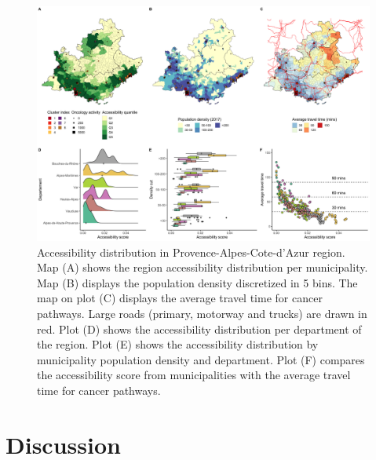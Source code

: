 \begin{figure}[h]
    \includegraphics[width=\textwidth]{images/camion/fig4_accessibility_Provence-Alpes-Cote-d'Azur.png}
    \centering
    \caption{
        Accessibility distribution in Provence-Alpes-Cote-d'Azur region. Map (A) shows the region accessibility distribution per municipality. Map (B) displays the population density discretized in 5 bins. The map on plot (C) displays the average travel time for cancer pathways. Large roads (primary, motorway and trucks) are drawn in red. Plot (D) shows the accessibility distribution per department of the region. Plot (E) shows the accessibility distribution by municipality population density and department. Plot (F) compares the accessibility score from municipalities with the average travel time for cancer pathways.
    }
    \label{fig:accessibility-paca}
\end{figure}

\section{Discussion}

